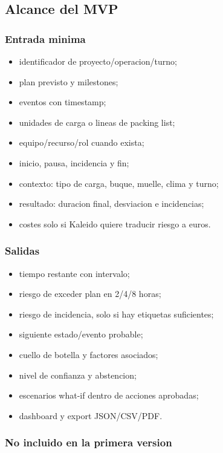 \documentclass[
  spanish,
  10pt,
  a4paper,
]{article}
\providecommand{\tightlist}{%
  \setlength{\itemsep}{0pt}\setlength{\parskip}{0pt}}
\begin{document}
\subsection{Alcance del MVP}\label{alcance-del-mvp}

\subsubsection{Entrada minima}\label{entrada-minima}

\begin{itemize}
\tightlist
\item
  identificador de proyecto/operacion/turno;
\item
  plan previsto y milestones;
\item
  eventos con timestamp;
\item
  unidades de carga o lineas de packing list;
\item
  equipo/recurso/rol cuando exista;
\item
  inicio, pausa, incidencia y fin;
\item
  contexto: tipo de carga, buque, muelle, clima y turno;
\item
  resultado: duracion final, desviacion e incidencias;
\item
  costes solo si Kaleido quiere traducir riesgo a euros.
\end{itemize}

\subsubsection{Salidas}\label{salidas}

\begin{itemize}
\tightlist
\item
  tiempo restante con intervalo;
\item
  riesgo de exceder plan en 2/4/8 horas;
\item
  riesgo de incidencia, solo si hay etiquetas suficientes;
\item
  siguiente estado/evento probable;
\item
  cuello de botella y factores asociados;
\item
  nivel de confianza y abstencion;
\item
  escenarios what-if dentro de acciones aprobadas;
\item
  dashboard y export JSON/CSV/PDF.
\end{itemize}

\subsubsection{No incluido en la primera
version}\label{no-incluido-en-la-primera-version}
\end{document}
